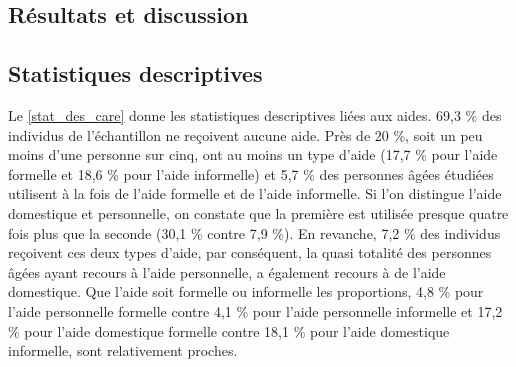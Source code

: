 \begin{Article}
\begin{refsection}[Bonnal]
						\section{Résultats et discussion}

\subsection{Statistiques descriptives}

Le \autoref{stat_des_care} donne les statistiques descriptives liées aux aides. 69,3 \% des individus de l'échantillon ne reçoivent aucune aide. Près de 20 \%,  soit un peu moins d'une personne sur cinq, ont au moins un type d'aide (17,7 \% pour l'aide formelle et 18,6 \% pour l'aide informelle) et 5,7 \% des personnes âgées étudiées utilisent à la fois de l'aide formelle et de l'aide informelle. Si l'on distingue l'aide domestique et personnelle, on constate que la première est utilisée presque quatre fois plus que la seconde (30,1 \% contre 7,9 \%). En revanche, 7,2 \% des individus reçoivent ces deux types d'aide, par conséquent, la quasi totalité des personnes âgées ayant recours à l'aide personnelle, a également recours à de l'aide domestique. Que l'aide soit formelle ou informelle les proportions, 4,8 \% pour l'aide personnelle formelle contre 4,1 \% pour l'aide personnelle informelle et 17,2 \% pour l'aide domestique formelle contre 18,1 \% pour l'aide domestique informelle, sont relativement proches.


\end{refsection}
\end{Article}
